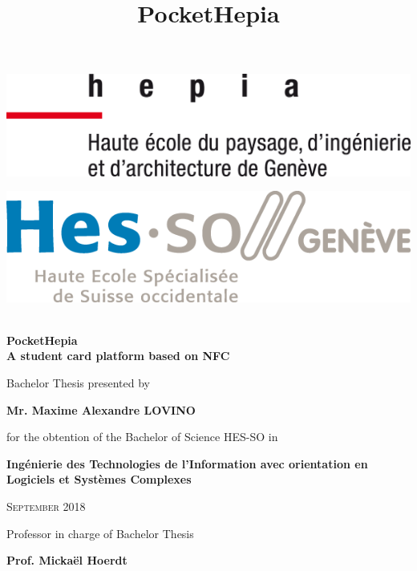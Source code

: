 \documentclass[twoside, openright,11pt,a4paper]{book}
\title{PocketHepia}
\begin{document}
\begin{titlepage}
	\centering
	\begin{minipage}{.5\textwidth}
		\centering
		\includegraphics[width=.7\linewidth]{assets/logo_hepia.png}
	\end{minipage}%
	\begin{minipage}{.5\textwidth}
		\centering
		\includegraphics[width=.7\linewidth]{assets/logo_hes.png}
	\end{minipage}
	\vspace{3cm}
	{\huge\bfseries \\PocketHepia\\A student card platform based on NFC \par}
			\vspace{2cm}
	{\Large Bachelor Thesis presented by \par}
				\vspace{0.5cm}
		{\Large \bfseries Mr. Maxime Alexandre LOVINO\par}
				\vspace{0.5cm}
			{\Large for the obtention of the Bachelor of Science HES-SO in \par}
				\vspace{0.5cm}
			{\Large \bfseries Ingénierie des Technologies de l’Information avec orientation en
Logiciels et Systèmes Complexes \par}	
	\vspace{2cm}
	{\scshape\Large September 2018\par}
	\vfill
	\raggedright
	Professor in charge of Bachelor Thesis\par
	{\bfseries Prof. Mickaël Hoerdt}
	\vfill
\end{titlepage}
\frontmatter
\pagestyle{plain}



\tableofcontents
\listoffigures
\renewcommand\listoflistingscaption{Source code listings}
\listoflistings
\listoftables
\end{document}
